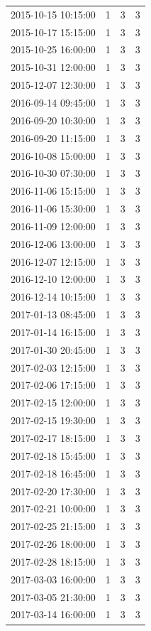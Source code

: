 \begin{tabular}{lrrr}
2015-10-15 10:15:00 & 1 & 3 & 3 \\
2015-10-17 15:15:00 & 1 & 3 & 3 \\
2015-10-25 16:00:00 & 1 & 3 & 3 \\
2015-10-31 12:00:00 & 1 & 3 & 3 \\
2015-12-07 12:30:00 & 1 & 3 & 3 \\
2016-09-14 09:45:00 & 1 & 3 & 3 \\
2016-09-20 10:30:00 & 1 & 3 & 3 \\
2016-09-20 11:15:00 & 1 & 3 & 3 \\
2016-10-08 15:00:00 & 1 & 3 & 3 \\
2016-10-30 07:30:00 & 1 & 3 & 3 \\
2016-11-06 15:15:00 & 1 & 3 & 3 \\
2016-11-06 15:30:00 & 1 & 3 & 3 \\
2016-11-09 12:00:00 & 1 & 3 & 3 \\
2016-12-06 13:00:00 & 1 & 3 & 3 \\
2016-12-07 12:15:00 & 1 & 3 & 3 \\
2016-12-10 12:00:00 & 1 & 3 & 3 \\
2016-12-14 10:15:00 & 1 & 3 & 3 \\
2017-01-13 08:45:00 & 1 & 3 & 3 \\
2017-01-14 16:15:00 & 1 & 3 & 3 \\
2017-01-30 20:45:00 & 1 & 3 & 3 \\
2017-02-03 12:15:00 & 1 & 3 & 3 \\
2017-02-06 17:15:00 & 1 & 3 & 3 \\
2017-02-15 12:00:00 & 1 & 3 & 3 \\
2017-02-15 19:30:00 & 1 & 3 & 3 \\
2017-02-17 18:15:00 & 1 & 3 & 3 \\
2017-02-18 15:45:00 & 1 & 3 & 3 \\
2017-02-18 16:45:00 & 1 & 3 & 3 \\
2017-02-20 17:30:00 & 1 & 3 & 3 \\
2017-02-21 10:00:00 & 1 & 3 & 3 \\
2017-02-25 21:15:00 & 1 & 3 & 3 \\
2017-02-26 18:00:00 & 1 & 3 & 3 \\
2017-02-28 18:15:00 & 1 & 3 & 3 \\
2017-03-03 16:00:00 & 1 & 3 & 3 \\
2017-03-05 21:30:00 & 1 & 3 & 3 \\
2017-03-14 16:00:00 & 1 & 3 & 3 \\

\end{tabular}
